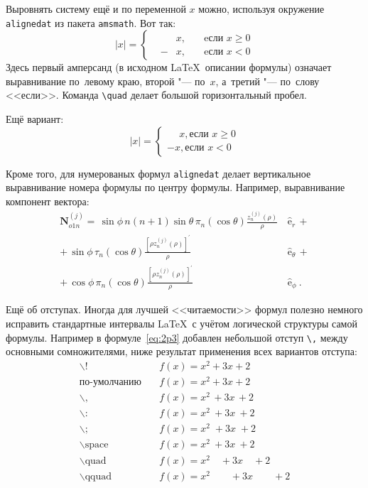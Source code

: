 Выровнять систему ещё и по переменной $ x $ можно, используя окружение \verb|alignedat| из пакета \verb|amsmath|. Вот так: 
\[
    |x| = \left\{
    \begin{alignedat}{2}
        &&x, \quad &\text{eсли } x\geqslant 0 \\
        &-&x, \quad & \text{eсли } x<0
    \end{alignedat}
    \right.
\]
Здесь первый амперсанд (в исходном \LaTeX\ описании формулы) означает выравнивание по~левому краю, второй "--- по~$ x $, а~третий "--- по~слову <<если>>. Команда \verb|\quad| делает большой горизонтальный пробел.

Ещё вариант:
\[
    |x|=
    \begin{cases}
    \phantom{-}x, \text{если } x \geqslant 0 \\
    -x, \text{если } x<0
    \end{cases}
\]

Кроме того, для  нумерованых формул \verb|alignedat|  делает вертикальное
выравнивание номера формулы по центру формулы. Например,  выравнивание компонент вектора:
\begin{equation}
 \label{eq:2p3}
 \begin{alignedat}{2}
{\mathbf{N}}_{o1n}^{(j)} = \,{\sin} \phi\,n\!\left(n+1\right)
         {\sin}\theta\,
         \pi_n\!\left({\cos} \theta\right)
         \frac{
               z_n^{(j)}\!\left( \rho \right)
              }{\rho}\,
           &{\boldsymbol{\hat{\mathrm e}}}_{r}\,+   \\
+\,
{\sin} \phi\,
         \tau_n\!\left({\cos} \theta\right)
         \frac{
            \left[\rho z_n^{(j)}\!\left( \rho \right)\right]^{\prime}
              }{\rho}\,
            &{\boldsymbol{\hat{\mathrm e}}}_{\theta}\,+   \\
+\,
{\cos} \phi\,
         \pi_n\!\left({\cos} \theta\right)
         \frac{
            \left[\rho z_n^{(j)}\!\left( \rho \right)\right]^{\prime}
              }{\rho}\,
            &{\boldsymbol{\hat{\mathrm e}}}_{\phi}\:.
\end{alignedat}
\end{equation}

Ещё об отступах. Иногда для лучшей <<читаемости>> формул полезно
немного исправить стандартные интервалы \LaTeX\ с учётом логической
структуры самой формулы. Например в формуле~\ref{eq:2p3} добавлен
небольшой отступ \verb+\,+ между основными сомножителями, ниже
результат применения всех вариантов отступа:
\begin{align*}
\backslash! &\quad f(x) = x^2\! +3x\! +2 \\
  \mbox{по-умолчанию} &\quad f(x) = x^2+3x+2 \\
\backslash, &\quad f(x) = x^2\, +3x\, +2 \\
\backslash{:} &\quad f(x) = x^2\: +3x\: +2 \\
\backslash; &\quad f(x) = x^2\; +3x\; +2 \\
\backslash \mbox{space} &\quad f(x) = x^2\ +3x\ +2 \\
\backslash \mbox{quad} &\quad f(x) = x^2\quad +3x\quad +2 \\
\backslash \mbox{qquad} &\quad f(x) = x^2\qquad +3x\qquad +2
\end{align*}


